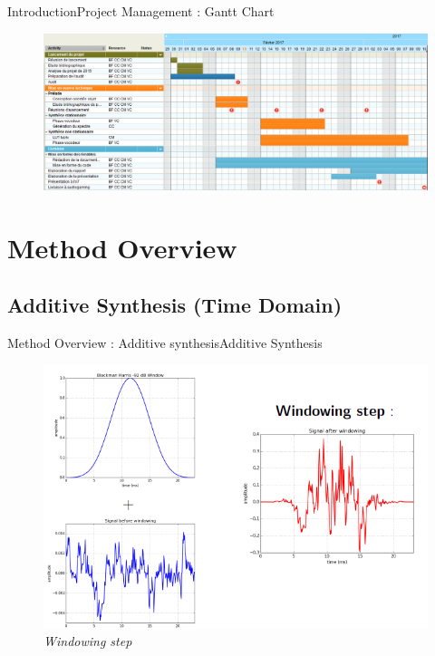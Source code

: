 \documentclass[10pt]{beamer}
\begin{document}
\begin{frame}{Introduction}{Project Management : Gantt Chart}

\begin{figure}
	\centerline{\includegraphics[scale=0.26]{Gantt.png}}
\end{figure}
\end{frame}

\section{Method Overview}
\subsection{Additive Synthesis (Time Domain)}
\begin{frame}{Method Overview : Additive synthesis}{Additive Synthesis}
\begin{figure}
	\centerline
	{\includegraphics[scale=0.4]{slide1.png}}
	\caption{\it Windowing step}
\end{figure}
\end{frame}
\end{document}
